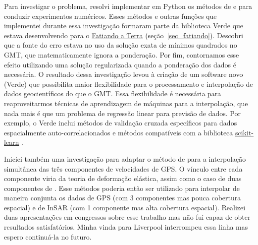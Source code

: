 \documentclass[10pt,a4paper,oneside]{book}
\newcommand{\FatiandoLink}{\href{https://www.fatiando.org}{Fatiando a Terra}}
\begin{document}
Para investigar o problema, resolvi implementar em Python os métodos de
\citet{Sandwell1987} e \citet{Sandwell2016} para conduzir experimentos
numéricos.
Esses métodos e outras funções que implementei durante essa investigação
formaram parte da biblioteca \href{https://www.fatiando.org/verde}{Verde}
que estava desenvolvendo para o \FatiandoLink{} (seção~\ref{sec_fatiando}).
Descobri que a fonte do erro estava no uso da solução exata de mínimos
quadrados no GMT, que matematicamente ignora a ponderação.
Por fim, contornamos esse efeito utilizando uma solução regularizada quando
a ponderação dos dados é necessária.
O resultado dessa investigação levou à criação de um software novo (Verde) que
possibilita maior flexibilidade para o processamento e interpolação de dados
geocientíficos do que o GMT.
Essa flexibilidade é necessária para reaproveitarmos técnicas de aprendizagem
de máquinas para a interpolação, que nada mais é que um problema de regressão
linear para previsão de dados.
Por exemplo, o Verde inclui métodos de validação cruzada específicos para dados
espacialmente auto-correlacionados \citep{Roberts2017} e métodos compatíveis
com a biblioteca \href{https://scikit-learn.org/stable/}{scikit-learn}
\citep{Pedregosa2011}.

Iniciei também uma investigação para adaptar o método de \citet{Sandwell2016}
para a interpolação simultânea das três componentes de velocidades de GPS.
O vínculo entre cada componente viria da teoria de deformação elástica, assim
como o caso de duas componentes de \citet{Sandwell2016}.
Esse métodos poderia então ser utilizado para interpolar de maneira conjunta
os dados de GPS (com 3 componentes mas pouca cobertura espacial) e de InSAR
(com 1 componente mas alta cobertura espacial).
Realizei duas apresentações em congressos sobre esse trabalho mas não fui capaz
de obter resultados satisfatórios.
Minha vinda para Liverpool interrompeu essa linha mas espero continuá-la no
futuro.
\end{document}
